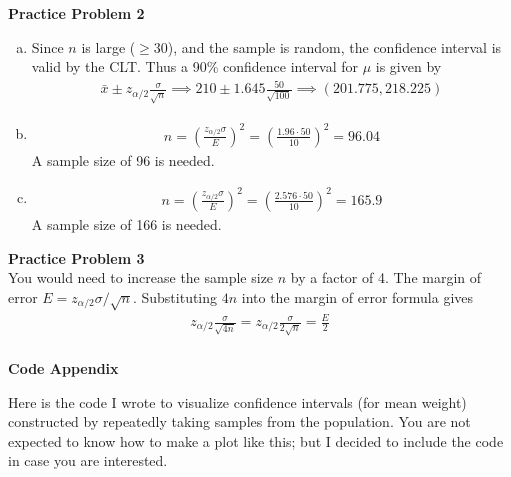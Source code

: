 \documentclass[fleqn, 11pt]{article}\usepackage[]{graphicx}\usepackage[]{color}
\begin{document}
\textbf{Practice Problem 2}
\begin{enumerate}[(a)]
\item
Since $n$ is large ($\geq 30$), and the sample is random, the confidence interval is valid by the CLT.  Thus a 90\% confidence interval for $\mu$ is given by\\
\begin{align*}
\bar{x} \pm z_{\alpha/2} \frac{\sigma}{\sqrt{n}} \implies 210 \pm 1.645 \frac{50}{\sqrt{100}} \implies (201.775, 218.225)
\end{align*}
\item
\begin{align*}
n = \left(\frac{z_{\alpha/2} \sigma}{E} \right)^2 = \left( \frac{1.96\cdot 50}{10} \right)^2 = 96.04
\end{align*}
A sample size of 96 is needed.\\
\item
\begin{align*}
n = \left(\frac{z_{\alpha/2} \sigma}{E} \right)^2 = \left( \frac{2.576\cdot 50}{10} \right)^2 = 165.9
\end{align*}
A sample size of 166 is needed.\\
\end{enumerate}

\textbf{Practice Problem 3}\\
You would need to increase the sample size $n$ by a factor of 4.  The margin of error $E = z_{\alpha/2} \sigma / \sqrt{n}$.  Substituting $4n$ into the margin of error formula gives
\begin{align*}
z_{\alpha/2} \frac{\sigma}{\sqrt{4n}} = z_{\alpha/2} \frac{\sigma}{2\sqrt{n}} = \frac{E}{2}\\
\end{align*}

\clearpage

\textbf{Code Appendix}

Here is the code I wrote to visualize confidence intervals (for mean weight) constructed by repeatedly taking samples from the population.  You are not expected to know how to make a plot like this; but I decided to include the code in case you are interested.
\end{document}
